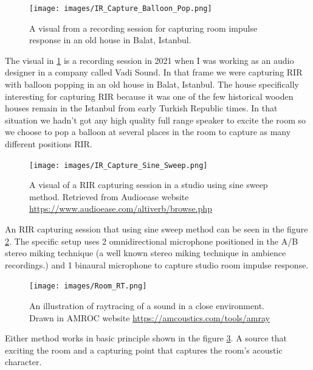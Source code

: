            \begin{figure}[H]
                \centering
                \texttt{[image: images/IR\_Capture\_Balloon\_Pop.png]}
                \caption{A visual from a recording session for capturing room impulse response in an old house in Balat, Istanbul.}
                \label{fig:IR_BALLOON}
            \end{figure}            

            The visual in \ref{fig:IR_BALLOON} is a recording session in 2021 when I was working as an audio designer in a company called Vadi Sound. In that frame we were capturing RIR with balloon popping in an old house in Balat, Istanbul. The house specifically interesting for capturing RIR because it was one of the few historical wooden houses remain in the Istanbul from early Turkish Republic times. In that situation we hadn't got any high quality full range speaker to excite the room so we choose to pop a balloon at several places in the room to capture as many different positions RIR.\par

            \begin{figure}[H]
                \centering
                \texttt{[image: images/IR\_Capture\_Sine\_Sweep.png]}
                \caption{A visual of a RIR capturing session in a studio using sine sweep method. Retrieved from Audioease website \url{https://www.audioease.com/altiverb/browse.php}}
                \label{fig:IR_SINE}
            \end{figure}

            An RIR capturing session that using sine sweep method can be seen in the figure \ref{fig:IR_SINE}. The specific setup uses 2 omnidirectional microphone positioned in the A/B stereo miking technique (a well known stereo miking technique in ambience recordings.)\cite{Sound_Reinforcement}\cite{Professional_Microphone_Techniques} and 1 binaural microphone to capture studio room impulse response.\par

            \begin{figure}[H]
                \centering
                \texttt{[image: images/Room\_RT.png]}
                \caption{An illustration of raytracing of a sound in a close environment. Drawn in AMROC website \url{https://amcoustics.com/tools/amray}}
                \label{fig:IR_RAYTRACE}
            \end{figure}

            Either method works in basic principle shown in the figure \ref{fig:IR_RAYTRACE}. A source that exciting the room and a capturing point that captures the room's acoustic character.\par

